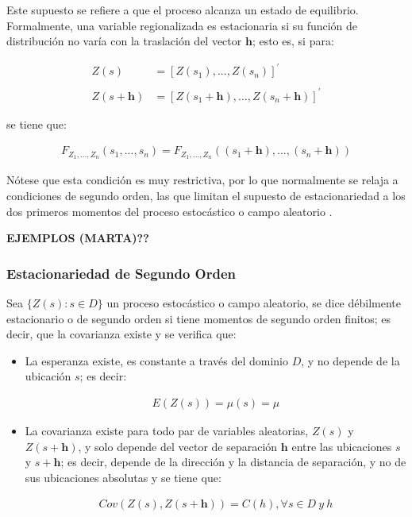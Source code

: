 \documentclass[
]{book}
\begin{document}
Este supuesto se refiere a que el proceso alcanza un estado de equilibrio. Formalmente, una variable regionalizada es estacionaria si su función de distribución no varía con la traslación del vector \(\textbf{h}\); esto es, si para:

\begin{align*}
    Z(s)&=[Z(s_1),...,Z(s_n)]^{'} \\ \\
    Z(s+\textbf{h})&=[Z(s_{1} +\textbf{h}),...,Z(s_{n} + \textbf{h} )]^{'}
\end{align*}

se tiene que:

\begin{align*}
  F_{Z_1,...,Z_n}(s_1,...,s_n)=F_{Z_1,...,Z_n}((s_1+\textbf{h}),...,(s_n+\textbf{h}))  
\end{align*}

Nótese que esta condición es muy restrictiva, por lo que normalmente se relaja a condiciones de segundo orden, las que limitan el supuesto de estacionariedad a los dos primeros momentos del proceso estocástico o campo aleatorio \citep{montero}.

\textbf{EJEMPLOS (MARTA)??}

\hypertarget{estacionariedad-de-segundo-orden}{%
\subsubsection*{Estacionariedad de Segundo Orden}\label{estacionariedad-de-segundo-orden}}

Sea \(\{Z(s): s\in D \}\) un proceso estocástico o campo aleatorio, se dice débilmente estacionario o de segundo orden si tiene momentos de segundo orden finitos; es decir, que la covarianza existe y se verifica que:

\begin{itemize}
\item
  La esperanza existe, es constante a través del dominio \(D\), y no depende de la ubicación \(s\); es decir:

  \begin{align*}
      E(Z(s))=\mu(s)=\mu  
    \end{align*}
\item
  La covarianza existe para todo par de variables aleatorias, \(Z(s)\) y \(Z(s+\textbf{h})\), y solo depende del vector de separación \(\textbf{h}\) entre las ubicaciones \(s\) y \(s+\textbf{h}\); es decir, depende de la dirección y la distancia de separación, y no de sus ubicaciones absolutas y se tiene que:

  \[
  \begin{align*}
      Cov(Z(s),Z(s+\textbf{h}))=C(h),\forall s\in D \ y\ h  
    \end{align*}
  \]
\end{itemize}
\end{document}
